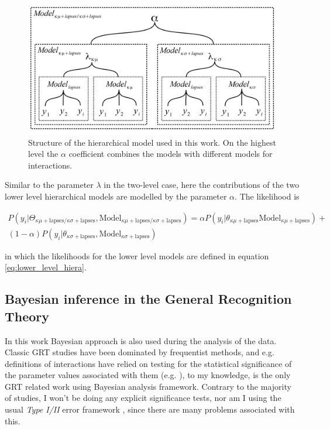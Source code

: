 \documentclass{article}\usepackage{knitr}
\begin{document}
\begin{figure}[!htb]
\begin{center}
\includegraphics[width=\textwidth]{Structure_of_hierarchical_mixture_model}
\end{center}
\caption{Structure of the hierarchical model used in this work. On the highest level the $\alpha$ coefficient combines the models with different models for interactions.}
\label{fig:Structure_of_hierarchical_model}
\end{figure}

Similar to the parameter $\lambda$ in the two-level case, here the contributions of the two lower level hierarchical models are modelled by the parameter $\alpha$. The likelihood is

\begin{multline}
P(y_i |\Theta_{\kappa \mu + \text{lapses} / \kappa \sigma  + \text{lapses}}, \text{Model}_{\kappa \mu + \text{lapses} / \kappa \sigma  + \text{lapses}}) = \alpha P(y_i |\theta_{\kappa \mu + \text{lapses}} \text{Model}_{\kappa \mu + \text{lapses}}) + \\ (1 - \alpha) P(y_i |\theta_{\kappa \sigma  + \text{lapses}}, \text{Model}_{\kappa \sigma  + \text{lapses}})
\end{multline}

in which the likelihoods for the lower level models are defined in equation \ref{eq:lower_level_hiera}.

\subsection{Bayesian inference in the General Recognition Theory}

In this work Bayesian approach is also used during the analysis of the data. Classic GRT studies have been dominated by frequentist methods, and e.g. definitions of interactions have relied on testing for the statistical significance of the parameter values associated with them (e.g. \cite{ashby2015, wickens1992}), to my knowledge, \cite{silbert2010} is the only GRT related work using Bayesian analysis framework. Contrary to the majority of studies, I won't be doing any explicit significance tests, nor am I using the usual \textit{Type I/II} error framework \citep[pp. 470 - 471]{christensen1997}, since there are many problems associated with this.
\end{document}
